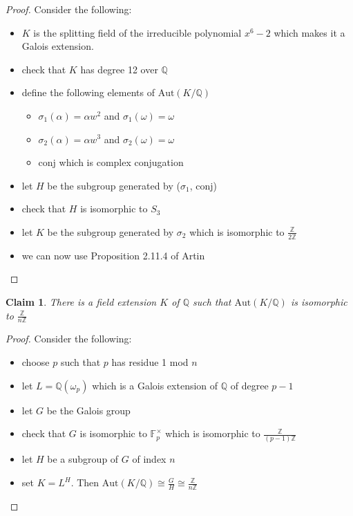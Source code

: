 \documentclass{article}
\newtheorem{claim}{Claim}
\begin{document}
\begin{proof}
  Consider the following:
  \begin{itemize}
    \item $K$ is the splitting field of the irreducible polynomial $x^6-2$ which makes it a Galois extension.
    \item check that $K$ has degree 12 over $\mathbb{Q}$
    \item define the following elements of $\text{Aut}(K/\mathbb{Q})$
    \begin{itemize}
      \item $\sigma_1(\alpha) = \alpha w^2$ and $\sigma_1(\omega)=\omega$
      \item $\sigma_2(\alpha) = \alpha w^3$ and $\sigma_2(\omega)=\omega$
      \item $\text{conj}$ which is complex conjugation
    \end{itemize}
    \item let $H$ be the subgroup generated by ($\sigma_1$, $\text{conj}$)
    \item check that $H$ is isomorphic to $S_3$
    \item let $K$ be the subgroup generated by $\sigma_2$ which is isomorphic to $\frac{\mathbb{Z}}{2\mathbb{Z}}$
    \item we can now use Proposition 2.11.4 of Artin 
  \end{itemize}
\end{proof}

\begin{claim}
  There is a field extension $K$ of $\mathbb{Q}$ such that $\text{Aut}(K / \mathbb{Q})$ is isomorphic to $\frac{\mathbb{Z}}{n\mathbb{Z}}$
\end{claim}

\begin{proof}
  Consider the following:
  \begin{itemize}
    \item choose $p$ such that $p$ has residue 1 mod $n$
    \item let $L=\mathbb{Q}(\omega_p)$ which is a Galois extension of $\mathbb{Q}$ of degree $p-1$
    \item let $G$ be the Galois group 
    \item check that $G$ is isomorphic to $\mathbb{F}_p^\times$ which is isomorphic to $\frac {\mathbb{Z}}   {   (p-1) \mathbb{Z} }  $
    \item let $H$ be a subgroup of $G$ of index $n$
    \item set $K=L^H$. Then $\text{Aut}(K / \mathbb{Q}) \cong \frac{G}{H} \cong \frac{\mathbb{Z}}{n\mathbb{Z}}$
  \end{itemize}
\end{proof}
\end{document}
